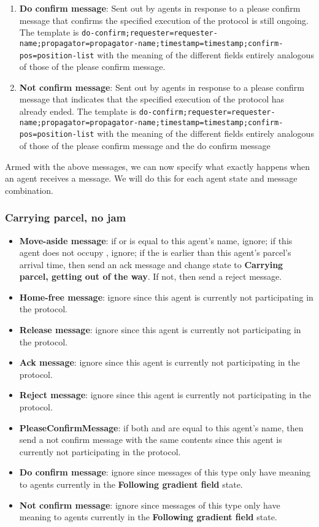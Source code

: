 \begin{enumerate}
\begin{enumerate}
        \end{enumerate}
    \item \textbf{Do confirm message}: Sent out by agents in response to a please confirm message that confirms the specified execution of the protocol is still ongoing. The template is \texttt{do-confirm;requester=requester-name;propagator=propagator-name;timestamp=timestamp;confirm-pos=position-list} with the meaning of the different fields entirely analogous of those of the please confirm message.
    \item \textbf{Not confirm message}: Sent out by agents in response to a please confirm message that indicates that the specified execution of the protocol has already ended. The template is \texttt{do-confirm;requester=requester-name;propagator=propagator-name;timestamp=timestamp;confirm-pos=position-list} with the meaning of the different fields entirely analogous of those of the please confirm message and the do confirm message
\end{enumerate}

Armed with the above messages, we can now specify what exactly happens when an agent receives a message. We will do this for each agent state and message combination.

\subsubsection*{Carrying parcel, no jam}
\begin{itemize}
    \item \textbf{Move-aside message}: if  or  is equal to this agent's name, ignore; if this agent does not occupy , ignore; if the  is earlier than this agent's parcel's arrival time, then send an ack message and change state to \textbf{Carrying parcel, getting out of the way}. If not, then send a reject message.
    \item \textbf{Home-free message}: ignore since this agent is currently not participating in the protocol.
    \item \textbf{Release message}: ignore since this agent is currently not participating in the protocol.
    \item \textbf{Ack message}: ignore since this agent is currently not participating in the protocol.
    \item \textbf{Reject message}: ignore since this agent is currently not participating in the protocol.
    \item \textbf{PleaseConfirmMessage}: if both  and  are equal to this agent's name, then send a not confirm message with the same contents since this agent is currently not participating in the protocol.
    \item \textbf{Do confirm message}: ignore since messages of this type only have meaning to agents currently in the \textbf{Following gradient field} state.
    \item \textbf{Not confirm message}: ignore since messages of this type only have meaning to agents currently in the \textbf{Following gradient field} state.
\end{itemize}

